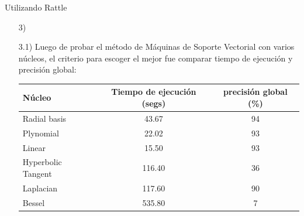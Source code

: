 \documentclass[11pt,a4paper]{report}
\begin{document}
\begin{center}
Utilizando Rattle
\end{center}


\begin{itemize}
\item[3)]
\item[3.1)] Luego de probar el método de Máquinas de Soporte Vectorial con varios núcleos, el criterio para escoger el mejor fue comparar tiempo de ejecución y precisión global:\\

\begin{tabular}{|l|c|c|}
\hline 
Núcleo & Tiempo de ejecución (segs) & precisión global (\%)\\
\hline
Radial basis & 43.67 & 94 \\
\hline 
Plynomial & 22.02 & 93 \\
\hline 
Linear & 15.50 & 93 \\
\hline 
Hyperbolic Tangent & 116.40 & 36 \\
\hline 
Laplacian & 117.60 & 90 \\
\hline
Bessel & 535.80 & 7 \\
\hline
\end{tabular} \\


\end{itemize}
\end{document}
